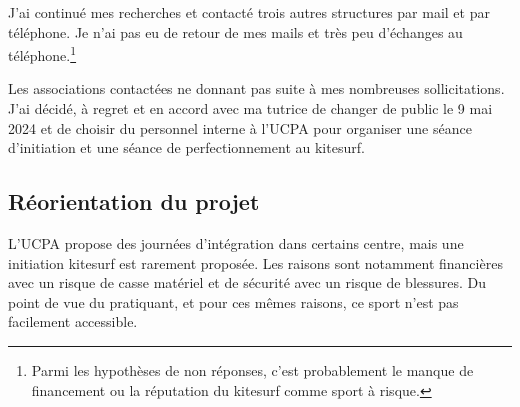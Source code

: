 \documentclass[11pt,a4paper]{report}
\begin{document}
J'ai continué mes recherches et contacté trois autres structures
par mail et par téléphone. Je n'ai pas eu de retour de mes mails 
et très peu d'échanges au téléphone.\footnote{Parmi les hypothèses
de non réponses, c'est probablement le manque de financement ou
la réputation du kitesurf comme sport  à risque.}

Les associations contactées ne donnant pas  suite à mes nombreuses
sollicitations. J'ai décidé, à regret et en accord avec ma tutrice
de changer de public le 9 mai 2024 et de choisir du personnel interne
à l'UCPA pour organiser une séance d'initiation et une séance de
perfectionnement au kitesurf.

\subsection{Réorientation du projet\label{reorientation}}

L'UCPA propose des journées d'intégration dans certains centre, mais
une initiation kitesurf est rarement proposée. Les raisons sont notamment
financières avec un risque de casse matériel et de sécurité avec un risque de blessures. Du point de vue du pratiquant, et pour ces m\^emes raisons, ce sport n'est pas facilement  accessible.

\end{document}
